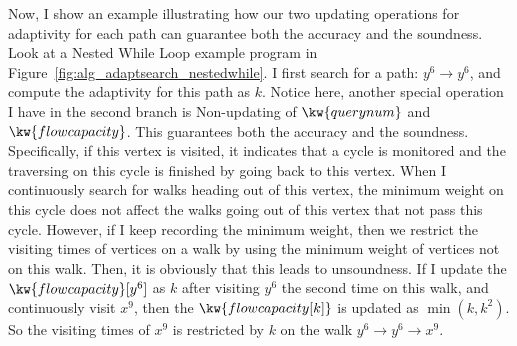 
\begin{example}
Now, I show an example illustrating how our two updating operations for adaptivity 
for each path can guarantee both the accuracy and the soundness. 
Look at a Nested While Loop example program in Figure~\ref{fig:alg_adaptsearch_nestedwhile}.
I first search for a path: $y^6 \to y^6$, and compute the adaptivity for this path as 
$k$.
Notice here, another special operation I have in the second branch is Non-updating of
$\kw{querynum}$ and $\kw{flowcapacity}$.
This guarantees both the accuracy and the soundness.
Specifically,
if this vertex is visited, it indicates that a cycle is monitored and  
the traversing on this cycle is finished by going back to this vertex.
%
When I continuously search for walks heading out of this vertex, 
the minimum weight on this cycle does not affect the walks going out of this vertex that not pass this cycle.
However, if I keep recording the minimum weight, then we
restrict the visiting times of vertices on a walk by
using the minimum weight of vertices not on this walk.
Then, it is obviously that this leads to unsoundness.
If I update the $\kw{flowcapacity}[y^6]$ as $k$ after visiting $y^6$ the second time 
on this walk,
and continuously visit $x^9$,
then the $\kw{flowcapacity[k]}$ is 
updated as $\min(k, k^2)$.
So
the visiting times of $x^9$ is restricted by $k$ on the walk $y^6 \to y^6 \to x^9$.

\end{example}
